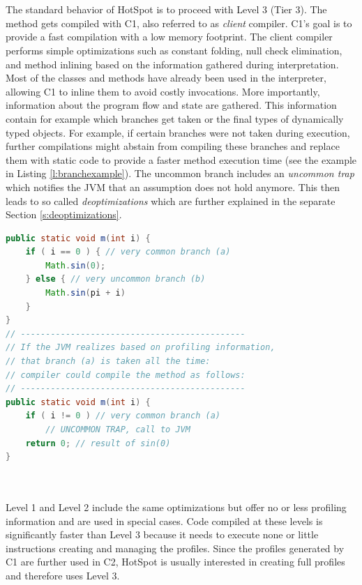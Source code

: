 \\\\
The standard behavior of HotSpot is to proceed with Level 3 (Tier 3). The method gets compiled with C1, also referred to as \textit{client} compiler.
C1's goal is to provide a fast compilation with a low memory footprint.
The client compiler performs simple optimizations such as constant folding, null check elimination, and method inlining based on the information gathered during interpretation. 
Most of the classes and methods have already been used in the interpreter, allowing C1 to inline them to avoid costly invocations.
More importantly, information about the program flow and state are gathered. This information contain for example which branches get taken or the final types of dynamically typed objects. 
For example, if certain branches were not taken during execution, further compilations might abstain from compiling these branches and replace them with static code to provide a faster method execution time (see the example in Listing \ref{l:branchexample}). The uncommon branch includes an \textit{uncommon trap} which notifies the JVM that an assumption does not hold anymore. This then leads to so called \textit{deoptimizations} which are further explained in the separate Section \ref{s:deoptimizations}.
\begin{lstlisting}[float,caption=Example that shows potential compilation based on profiling information,label=l:branchexample,language=Java]
public static void m(int i) {
    if ( i == 0 ) { // very common branch (a)
        Math.sin(0);
    } else { // very uncommon branch (b)
        Math.sin(pi + i)
    }
}
// ---------------------------------------------
// If the JVM realizes based on profiling information,
// that branch (a) is taken all the time:
// compiler could compile the method as follows:
// ---------------------------------------------
public static void m(int i) {
    if ( i != 0 ) // very common branch (a)
        // UNCOMMON TRAP, call to JVM
    return 0; // result of sin(0)
}
\end{lstlisting}
\\\\
Level 1 and Level 2 include the same optimizations but offer no or less profiling information and are used in special cases. Code compiled at these levels is significantly faster than Level 3 because it needs to execute none or little instructions creating and managing the profiles. Since the profiles generated by C1 are further used in C2, HotSpot is usually interested in creating full profiles and therefore uses Level 3.
